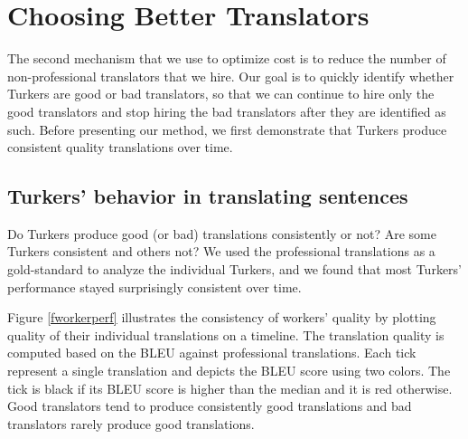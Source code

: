 \documentclass[11pt,letterpaper]{article}
\begin{document}
\section{Choosing Better Translators}

The second mechanism that we use to optimize cost is to reduce the number of non-professional translators that we hire.  Our goal is to quickly identify whether Turkers are good or bad translators, so that we can continue to hire only the good translators and stop hiring the bad translators after they are identified as such. 
%
Before presenting our method, we first demonstrate that Turkers produce consistent quality translations over time.


\subsection{Turkers' behavior in translating sentences}

Do Turkers produce good (or bad) translations consistently or not? Are some Turkers  consistent and others not? We used the professional translations as a gold-standard to analyze the individual Turkers, and we found that most Turkers' performance stayed surprisingly consistent over time. 

Figure \ref{fworkerperf} illustrates the consistency of workers' quality by plotting quality of their individual translations on a timeline. The translation quality is computed based on the BLEU against professional translations. Each tick represent a single translation and depicts the BLEU score using two colors. The tick is black if its BLEU score is higher than the median and it is red otherwise. Good translators tend to produce consistently good translations and bad translators rarely produce good translations.
\end{document}
